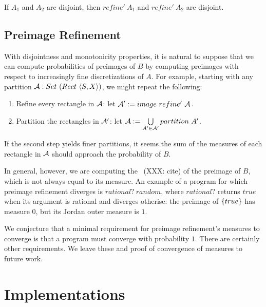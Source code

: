 \documentclass[preprint]{sigplanconf}
\begin{document}
\begin{corollary}
If $A_1$ and $A_2$ are disjoint, then $refine'~A_1$ and $refine'~A_2$ are disjoint.
\end{corollary}

\subsection{Preimage Refinement}
\label{sec:discretization}

With disjointness and monotonicity properties, it is natural to suppose that we can compute probabilities of preimages of $B$ by computing preimages with respect to increasingly fine discretizations of $A$.
For example, starting with any partition $\mathcal{A} : Set~(Rect~\langle{S,X}\rangle)$, we might repeat the following:
\begin{enumerate}
	\item Refine every rectangle in $\mathcal{A}$: let $\mathcal{A}' := image~refine'~\mathcal{A}$.
	\item Partition the rectangles in $\mathcal{A}'$: let $\mathcal{A} := \bigcup\limits_{A' \in \mathcal{A}'} partition~A'$.
\end{enumerate}
If the second step yields finer partitions, it seems the sum of the measures of each rectangle in $\mathcal{A}$ should approach the probability of $B$.

In general, however, we are computing the ~(XXX: cite) of the preimage of $B$, which is not always equal to its measure.
An example of a program for which preimage refinement diverges is $rational?~random$, where $rational?$ returns $true$ when its argument is rational and diverges otherise: the preimage of $\{{true}\}$ has measure $0$, but its Jordan outer measure is $1$.

We conjecture that a minimal requirement for preimage refinement's measures to converge is that a program must converge with probability $1$.
There are certainly other requirements.
We leave these and proof of convergence of measures to future work.


\section{Implementations}
\label{sec:implementation}
\end{document}
